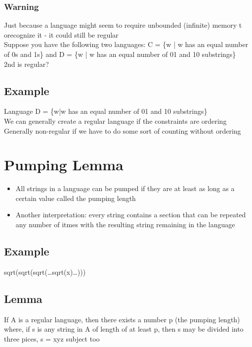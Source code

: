 \documentclass[11pt]{article}
\begin{document}
\subsubsection{Warning}
\label{sec:org3ddf7ea}
Just because a language might seem to require unbounded (infinite) memory t orecognize it - it could still be regular\\

Suppose you have the following two languages: C = \{w | w has an equal number of 0s and 1s\} and D = \{w | w has an equal number of 01 and 10 substrings\}\\

2nd is regular?\\
\subsection{Example}
\label{sec:org717321a}
Language D = \{w|w has an equal number of 01 and 10 substrings\}\\

We can generally create a regular language if the constraints are ordering\\
Generally non-regular if we have to do some sort of counting without ordering\\
\section{Pumping Lemma}
\label{sec:orgb23cace}
\begin{itemize}
\item All strings in a language can be pumped if they are at least as long as a certain value called the pumping length\\
\item Another interpretation: every string contains a section that can be repeated any number of itmes with the resulting string remaining in the language\\
\end{itemize}
\subsection{Example}
\label{sec:orgf20853b}
sqrt(sqrt(sqrt(\ldots{}sqrt(x)\ldots{})))\\
\subsection{Lemma}
\label{sec:org80bd5ea}
If A is a regular language, then there exists a number p (the pumping length) where, if s is any string in A of length of at least p, then s may be divided into three pices, s = xyz subject too\\
\end{document}

